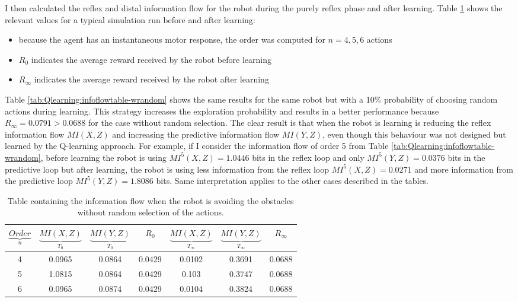 I then calculated the reflex and distal information flow for the robot during the purely reflex phase and after learning.
Table \ref{tab:Qlearning:infoflowtable-worandom} shows the relevant values
for a typical simulation run before and after learning:
\begin{itemize}
 \item because the agent has an instantaneous motor response, the order was computed
for $n=4,5,6$ actions
\item $R_0$ indicates the average reward received by the robot before learning
\item $R_\infty$ indicates the average reward received by the robot after learning
\end{itemize}
Table \ref{tab:Qlearning:infoflowtable-wrandom} shows the same results for the
same robot but with a 10\% probability of choosing random actions during learning.
This strategy increases the exploration probability and results in a better
performance because $R_\infty=0.0791>0.0688$ for the case without random selection.
The clear result is that when the robot is learning is reducing the reflex information
flow $MI(X,Z)$ and increasing the predictive information flow $MI(Y,Z)$,
even though this behaviour was not designed but learned by the Q-learning approach.
For example, if I consider the information flow of order 5 from Table \ref{tab:Qlearning:infoflowtable-wrandom},
before learning the robot is using $MI^{5}(X,Z)=1.0446$ bits in the reflex loop
and only $MI^{5}(Y,Z)=0.0376 $ bits in the predictive loop but after learning,
the robot is using less information from the reflex loop $MI^{5}(X,Z)=0.0271$ and
more information from the predictive loop $MI^{5}(Y,Z)=1.8086 $ bits.
Same interpretation applies to the other cases described in the tables.

\begin{table}[htbp]
\addtolength{\tabcolsep}{-2pt}
\centering
\begin{tabular}{| c|| c| c | c| c | c | c |}
\hline
$\underbrace{Order}_ n$& $\underbrace{MI(X,Z)}_{T_0}$& $\underbrace{MI(Y,Z)}_{T_0}$ & $R_0$ & $\underbrace{MI(X,Z)}_{T_\infty}$& $\underbrace{MI(Y,Z)}_{T_\infty}$ & $R_\infty$ \\
\hline
4 & 0.0965 & 0.0864 & 0.0429 & 0.0102 & 0.3691 & 0.0688 \\
\hline
5 & 1.0815 & 0.0864 & 0.0429 & 0.103 & 0.3747 & 0.0688 \\
\hline
6 & 0.0965 & 0.0874 & 0.0429 & 0.0104 & 0.3824 & 0.0688 \\
\hline
\end{tabular}
\caption[Information flow for avoidance robot]{Table containing the information flow when
the robot is avoiding the obstacles without random selection of the actions. \label{tab:Qlearning:infoflowtable-worandom}}
\end{table}


